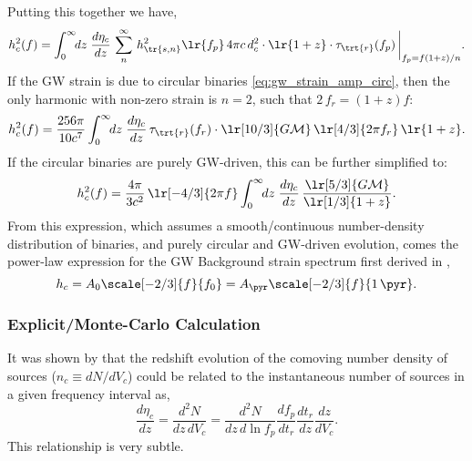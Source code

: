 \documentclass[10pt, oneside, onecolumn]{article}   	%
\newcommand{\hsn}{h_\tr{s,n}}
\newcommand{\thard}{\tau_\trt{r}}
\newcommand{\ndens}{\eta_c}
\begin{document}
                Putting this together we have,
                \begin{equation}
                    \label{eq:gwb_sam_general}
                    h_c^2(f) = \int_0^\infty \!\! dz \; \frac{d\ndens}{dz} \, \sum_n^\infty \, \hsn^2\lr{f_p} \, 4\pi c \, d_c^2 \cdot \lr{1+z} \cdot \thard(f_p) \, \bigg|_{f_p = f(1+z)/n}.
                \end{equation}
                If the GW strain is due to circular binaries \eqref{eq:gw_strain_amp_circ}, then the only harmonic with non-zero strain is $n=2$, such that $2 \, f_r = (1+z) f$:
                \begin{equation}
                    h_c^2(f) = \frac{256 \pi}{10 c^7} \int_0^\infty \!\! dz \; \frac{d\ndens}{dz} \, \thard(f_r) \cdot \lr[10/3]{G \mathcal{M}} \, \lr[4/3]{2\pi f_r} \, \lr{1+z}.
                \end{equation}
                If the circular binaries are purely GW-driven, this can be further simplified to:
                \begin{equation}
                    h_c^2(f) = \frac{4 \pi}{3 c^2} \, \lr[-4/3]{2\pi f} \int_0^\infty \!\! dz \; \frac{d\ndens}{dz}  \, \frac{\lr[5/3]{G \mathcal{M}}}{\lr[1/3]{1+z}}.
                \end{equation}
                From this expression, which assumes a smooth/continuous number-density distribution of binaries, and purely circular and GW-driven evolution, comes the power-law expression for the GW Background strain spectrum first derived in \citep[][Eq.~11]{Phinney-2001},
                \begin{equation}
                    h_c = A_0 \scale[-2/3]{f}{f_0} = A_{\pyr} \scale[-2/3]{f}{1 \, \pyr}.
                \end{equation}



            \subsubsection{Explicit/Monte-Carlo Calculation}

                It was shown by \citet[][Eq.~6]{sesana2008} that the redshift evolution of the comoving number density of sources ($n_c \equiv dN/dV_c$) could be related to the instantaneous number of sources in a given frequency interval as,
                \begin{equation}
                    \label{eq:number_density_to_number_frequency}
                    \frac{d\ndens}{dz} = \frac{d^2N}{dz \, dV_c} = \frac{d^2N}{dz \, d\ln f_p} \frac{d f_p}{dt_r} \frac{dt_r}{dz} \frac{dz}{dV_c}.
                \end{equation}
                This relationship is very subtle. \\
\end{document}
